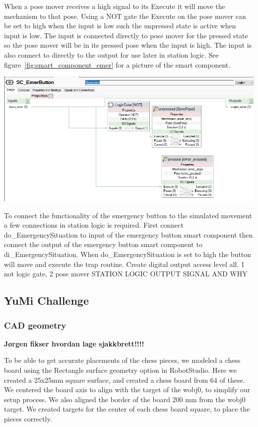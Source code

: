 \documentclass[a4paper,12pt]{article}
\begin{document}
When a pose mover receives a high signal to its Execute it will move the mechanism to that pose. Using a NOT gate the Execute on the pose mover can be set to high when the input is low such the unpressed state is active when input is low. The input is connected directly to pose mover for the pressed state so the pose mover will be in its pressed pose when the input is high. The input is also connect to directly to the output for use later in station logic. See figure~\ref{fig:smart_component_emer} for a picture of the smart component.
\begin{center}
    \includegraphics[width=0.8\linewidth]{SC_emer_button.png}
    \label{fig:smart_component_emer}
\end{center}
To connect the functionality of the emergency button to the simulated movement a few connections in station logic is required. First connect do\_EmergencySituation to input of the emergency button smart component then connect the output of the emergency button smart component to di\_EmergencySituation. When do\_EmergencySituation is set to high the button will move and execute the trap routine.
Create digital output access level all. 
1 not logic gate, 2 pose mover
STATION LOGIC
OUTPUT SIGNAL AND WHY


\subsection{YuMi Challenge}
\subsubsection{CAD geometry}
\textbf{Jørgen fikser hvordan lage sjakkbrett!!!!}

To be able to get accurate placements of the chess pieces, we modeled a chess board using the Rectangle surface geometry option in RobotStudio. Here we created a 25x25mm square surface, and created a chess board from 64 of these. We centered the board axis to align with the target of the wobj0, to simplify our setup process. We also aligned the border of the board 200 mm from the wobj0 target. 
We created targets for the center of each chess board square, to place the pieces correctly. 
\end{document}
